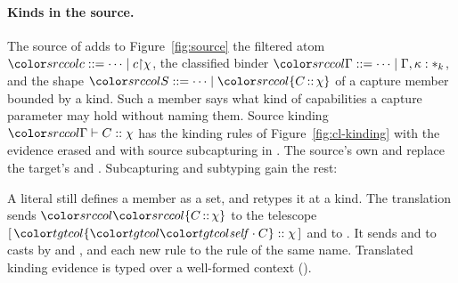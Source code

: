 \paragraph{Kinds in the source.}
The source of \treeCL adds to Figure~\ref{fig:source} the filtered atom $\src{c ::= \cdots \mid \restr{c}{\chi}}$, the classified binder $\src{\Gamma ::= \cdots \mid \Gamma, \kappa : \clsb{k}}$, and the shape $\src{S ::= \cdots \mid \dcapk{C}{\chi}}$ of a capture member bounded by a kind. Such a member says what kind of capabilities a capture parameter may hold without naming them. Source kinding $\kindsj{\Gamma}{C}{\chi}$ has the kinding rules of Figure~\ref{fig:cl-kinding} with the evidence erased and with source subcapturing in . The source's own  and  replace the target's  and . Subcapturing and subtyping gain the rest:
\begingroup\mathsrc
{}
\endgroup
A literal still defines a member as a set, and  retypes it at a kind. The translation sends $\src{\dcapk{C}{\chi}}$ to the telescope $[\,\pkind{\cset{\sel{\self}{C}}}{\chi}\,]$ and  to . It sends  and  to casts by  and , and each new  rule to the  rule of the same name. Translated kinding evidence is typed over a well-formed context ().

